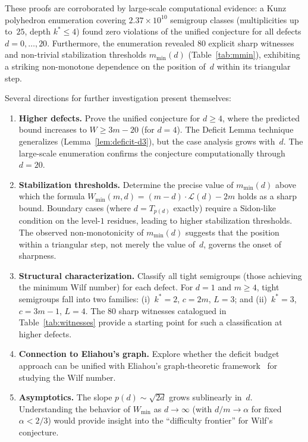 \documentclass[11pt]{amsart}
\theoremstyle{definition}
\theoremstyle{remark}
\begin{document}
These proofs are corroborated by large-scale computational evidence:
a Kunz polyhedron enumeration covering $2.37 \times 10^{10}$ semigroup
classes (multiplicities up to~$25$, depth $k^* \le 4$) found zero
violations of the unified conjecture for all defects $d = 0, \ldots, 20$.
Furthermore, the enumeration revealed $80$ explicit sharp witnesses
and non-trivial stabilization thresholds $m_{\min}(d)$ (Table~\ref{tab:mmin}),
exhibiting a striking non-monotone dependence on the position of~$d$
within its triangular step.

Several directions for further investigation present themselves:

\begin{enumerate}[nosep]
  \item \textbf{Higher defects.}
    Prove the unified conjecture for $d \ge 4$, where the predicted bound
    increases to $W \ge 3m - 20$ (for $d = 4$).
    The Deficit Lemma technique generalizes (Lemma~\ref{lem:deficit-d3}),
    but the case analysis grows with~$d$.  The large-scale enumeration
    confirms the conjecture computationally through $d = 20$.

  \item \textbf{Stabilization thresholds.}
    Determine the precise value of $m_{\min}(d)$ above which the formula
    $W_{\min}(m, d) = (m - d) \cdot \mathcal{L}(d) - 2m$ holds as a sharp bound.
    Boundary cases (where $d = T_{p(d)}$ exactly) require a Sidon-like condition
    on the level-$1$ residues, leading to higher stabilization thresholds.
    The observed non-monotonicity of $m_{\min}(d)$ suggests that the
    position within a triangular step, not merely the value of~$d$,
    governs the onset of sharpness.

  \item \textbf{Structural characterization.}
    Classify all tight semigroups (those achieving the minimum Wilf number)
    for each defect.  For $d = 1$ and $m \ge 4$, tight semigroups fall into
    two families: (i)~$k^* = 2$, $c = 2m$, $L = 3$; and
    (ii)~$k^* = 3$, $c = 3m - 1$, $L = 4$.
    The $80$ sharp witnesses catalogued in Table~\ref{tab:witnesses}
    provide a starting point for such a classification at higher defects.

  \item \textbf{Connection to Eliahou's graph.}
    Explore whether the deficit budget approach can be unified with
    Eliahou's graph-theoretic framework~\cite{Eliahou2020} for studying
    the Wilf number.

  \item \textbf{Asymptotics.}
    The slope $p(d) \sim \sqrt{2d}$ grows sublinearly in~$d$.
    Understanding the behavior of $W_{\min}$ as $d \to \infty$ (with
    $d/m \to \alpha$ for fixed $\alpha < 2/3$) would provide insight
    into the ``difficulty frontier'' for Wilf's conjecture.


\end{enumerate}
\end{document}
